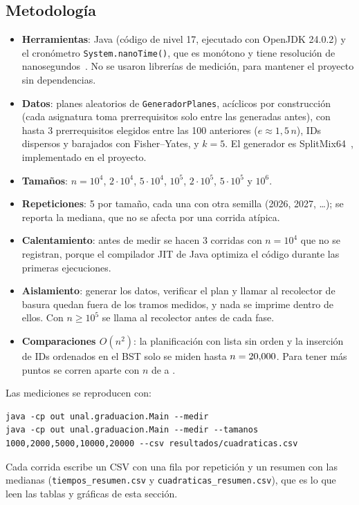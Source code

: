 \documentclass[11pt,letterpaper]{article}
\newcommand{\num}[1]{\pgfmathprintnumber[int detect]{#1}}
\begin{document}
\subsection{Metodología}
\begin{itemize}
\item \textbf{Herramientas}: Java (código de nivel 17, ejecutado con OpenJDK 24.0.2) y el cronómetro \texttt{System.nanoTime()}, que es monótono y tiene resolución de nanosegundos~\cite{oracle2021}. No se usaron librerías de medición, para mantener el proyecto sin dependencias.
\item \textbf{Datos}: planes aleatorios de \texttt{GeneradorPlanes}, acíclicos por construcción (cada asignatura toma prerrequisitos solo entre las generadas antes), con hasta 3 prerrequisitos elegidos entre las 100 anteriores ($e \approx 1{,}5\,n$), IDs dispersos y barajados con Fisher--Yates, y $k = 5$. El generador es SplitMix64~\cite{steele2014}, implementado en el proyecto.
\item \textbf{Tamaños}: $n = 10^4$, $2 \cdot 10^4$, $5 \cdot 10^4$, $10^5$, $2 \cdot 10^5$, $5 \cdot 10^5$ y $10^6$.
\item \textbf{Repeticiones}: 5 por tamaño, cada una con otra semilla (2026, 2027, …); se reporta la mediana, que no se afecta por una corrida atípica.
\item \textbf{Calentamiento}: antes de medir se hacen 3 corridas con $n = 10^4$ que no se registran, porque el compilador JIT de Java optimiza el código durante las primeras ejecuciones.
\item \textbf{Aislamiento}: generar los datos, verificar el plan y llamar al recolector de basura quedan fuera de los tramos medidos, y nada se imprime dentro de ellos. Con $n \geq 10^5$ se llama al recolector antes de cada fase.
\item \textbf{Comparaciones $O(n^2)$}: la planificación con lista sin orden y la inserción de IDs ordenados en el BST solo se miden hasta $n = \num{20000}$. Para tener más puntos se corren aparte con $n$ de \num{1000} a \num{20000}.
\end{itemize}
Las mediciones se reproducen con:
\begin{lstlisting}[style=consola]
java -cp out unal.graduacion.Main --medir
java -cp out unal.graduacion.Main --medir --tamanos 1000,2000,5000,10000,20000 --csv resultados/cuadraticas.csv
\end{lstlisting}

Cada corrida escribe un CSV con una fila por repetición y un resumen con las medianas (\texttt{tiempos\_resumen.csv} y \texttt{cuadraticas\_resumen.csv}), que es lo que leen las tablas y gráficas de esta sección.
\end{document}
